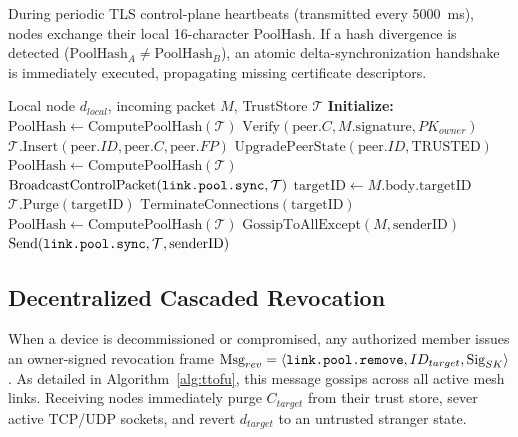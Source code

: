 \documentclass[conference]{IEEEtran}
\begin{document}
During periodic TLS control-plane heartbeats (transmitted every 5000~ms), nodes exchange their local 16-character $\text{PoolHash}$. If a hash divergence is detected ($\text{PoolHash}_A \neq \text{PoolHash}_B$), an atomic delta-synchronization handshake is immediately executed, propagating missing certificate descriptors.

\begin{algorithm}[t]
\caption{Transitive Pool Enrollment and Revocation Gossip}
\label{alg:ttofu}
\begin{algorithmic}[1]
\REQUIRE Local node $d_{local}$, incoming packet $M$, TrustStore $\mathcal{T}$
\STATE \textbf{Initialize:} $\text{PoolHash} \leftarrow \text{ComputePoolHash}(\mathcal{T})$
            \STATE $\text{Verify}(\text{peer}.C, M.\text{signature}, PK_{owner})$
            \STATE $\mathcal{T}.\text{Insert}(\text{peer}.ID, \text{peer}.C, \text{peer}.FP)$
            \STATE $\text{UpgradePeerState}(\text{peer}.ID, \text{TRUSTED})$
        \ENDIF
    \ENDFOR
    \STATE $\text{PoolHash} \leftarrow \text{ComputePoolHash}(\mathcal{T})$
    \STATE $\text{BroadcastControlPacket}(\text{\texttt{link.pool.sync}}, \mathcal{T})$
    \STATE $\text{targetID} \leftarrow M.\text{body}.\text{targetID}$
        \STATE $\mathcal{T}.\text{Purge}(\text{targetID})$
        \STATE $\text{TerminateConnections}(\text{targetID})$
        \STATE $\text{PoolHash} \leftarrow \text{ComputePoolHash}(\mathcal{T})$
        \STATE $\text{GossipToAllExcept}(M, \text{senderID})$
    \ENDIF
{}
        \STATE $\text{Send}(\text{\texttt{link.pool.sync}}, \mathcal{T}, \text{senderID})$
    \ENDIF
\ENDIF
\end{algorithmic}
\end{algorithm}

\subsection{Decentralized Cascaded Revocation}
When a device is decommissioned or compromised, any authorized member issues an owner-signed revocation frame $\text{Msg}_{rev} = \langle \text{\texttt{link.pool.remove}}, ID_{target}, \text{Sig}_{SK} \rangle$. As detailed in Algorithm~\ref{alg:ttofu}, this message gossips across all active mesh links. Receiving nodes immediately purge $C_{target}$ from their trust store, sever active TCP/UDP sockets, and revert $d_{target}$ to an untrusted stranger state.
\end{document}
